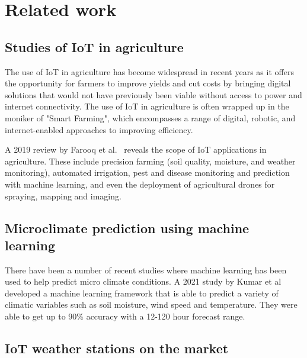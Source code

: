 \section{Related work}

\subsection{Studies of IoT in agriculture}

The use of IoT in agriculture has become widespread in recent years as it offers
the opportunity for farmers to improve yields and cut costs by bringing digital
solutions that would not have previously been viable without access to power and
internet connectivity. The use of IoT in agriculture is often wrapped up in the
moniker of "Smart Farming", which encompasses a range of digital, robotic, and
internet-enabled approaches to improving efficiency.

A 2019 review by Farooq et al.\ \cite{farooq2019iot} reveals the scope of IoT
applications in agriculture. These include precision farming (soil quality,
moisture, and weather monitoring), automated irrigation, pest and disease
monitoring and prediction with machine learning, and even the deployment of
agricultural drones for spraying, mapping and imaging. 

\subsection{Microclimate prediction using machine learning}

There have been a number of recent studies where machine learning has been used
to help predict micro climate conditions. A 2021 study by Kumar et al developed
a machine learning framework that is able to predict a variety of climatic
variables such as soil moisture, wind speed and temperature. They were able to
get up to 90\% accuracy with a 12-120 hour forecast range.

\subsection{IoT weather stations on the market}

